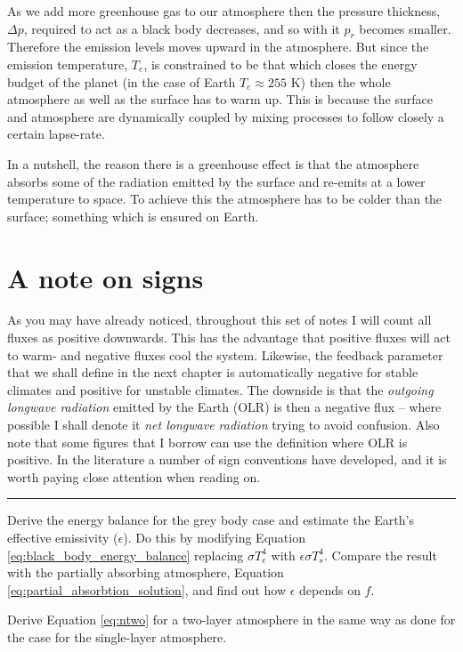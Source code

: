 \documentclass[12pt]{book}
\begin{document}
As we add more greenhouse gas to our atmosphere then the pressure thickness, $\Delta p$, required to act as a black body decreases, and so with it $p_r$ becomes smaller. Therefore the emission levels moves upward in the atmosphere. But since the emission temperature, $T_e$, is constrained to be that which closes the energy budget of the planet (in the case of Earth $T_e \approx 255$ K) then the whole atmosphere as well as the surface has to warm up. This is because the surface and atmosphere are dynamically coupled by mixing processes to follow closely a certain lapse-rate.

In a nutshell, the reason there is a greenhouse effect is that the atmosphere absorbs some of the radiation emitted by the surface and re-emits at a lower temperature to space. To achieve this the atmosphere has to be colder than the surface; something which is ensured on Earth.


\section{A note on signs}
As you may have already noticed, throughout this set of notes I will count all fluxes as positive downwards. This has the advantage that positive fluxes will act to warm- and negative fluxes cool the system. Likewise, the feedback parameter that we shall define in the next chapter is automatically negative for stable climates and positive for unstable climates. The downside is that the {\em outgoing longwave radiation} emitted by the Earth (OLR) is then a negative flux -- where possible I shall denote it {\em net longwave radiation} trying to avoid confusion. Also note that some figures that I borrow can use the definition where OLR is positive. In the literature a number of sign conventions have developed, and it is worth paying close attention when reading on.

\vspace{1 cm}
{\setlength{\parindent}{0cm}
\hrule
\begin{exercise}
Derive the energy balance for the grey body case and estimate the Earth's effective emissivity ($\epsilon$). Do this by modifying Equation \ref{eq:black_body_energy_balance} replacing $\sigma T_e^4$ with $\epsilon \sigma T_s^4$. Compare the result with the partially absorbing atmosphere, Equation \ref{eq:partial_absorbtion_solution}, and find out how $\epsilon$ depends on $f$.
\end{exercise}

\begin{exercise}
Derive Equation \ref{eq:ntwo} for a two-layer atmosphere in the same way as done for the case for the single-layer atmosphere.
\end{exercise}


}
\end{document}
